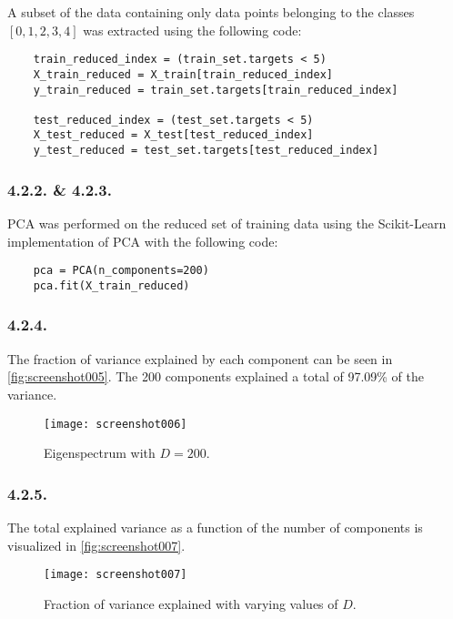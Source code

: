 \documentclass[a4paper, 12pt]{article}
\begin{document}
A subset of the data containing only data points belonging to the classes $[0, 1, 2, 3, 4]$ was extracted using the following code:

\begin{verbatim}
	train_reduced_index = (train_set.targets < 5)
	X_train_reduced = X_train[train_reduced_index]
	y_train_reduced = train_set.targets[train_reduced_index]
	
	test_reduced_index = (test_set.targets < 5)
	X_test_reduced = X_test[test_reduced_index]
	y_test_reduced = test_set.targets[test_reduced_index]
\end{verbatim}

\subsubsection{4.2.2. \& 4.2.3.}

PCA was performed on the reduced set of training data using the Scikit-Learn implementation of PCA with the following code:

\begin{verbatim}
	pca = PCA(n_components=200)
	pca.fit(X_train_reduced)
\end{verbatim}

\subsubsection{4.2.4.}

The fraction of variance explained by each component can be seen in \autoref{fig:screenshot005}. The 200 components explained a total of 97.09\% of the variance.

\begin{figure}[H]
	\centering
	\texttt{[image: screenshot006]}
	\caption{Eigenspectrum with $D = 200$.}
	\label{fig:screenshot005}
\end{figure}

\subsubsection{4.2.5.}

The total explained variance as a function of the number of components is visualized in \autoref{fig:screenshot007}.

\begin{figure}[H]
	\centering
	\texttt{[image: screenshot007]}
	\caption{Fraction of variance explained with varying values of $D$.}
	\label{fig:screenshot007}
\end{figure}
\end{document}
